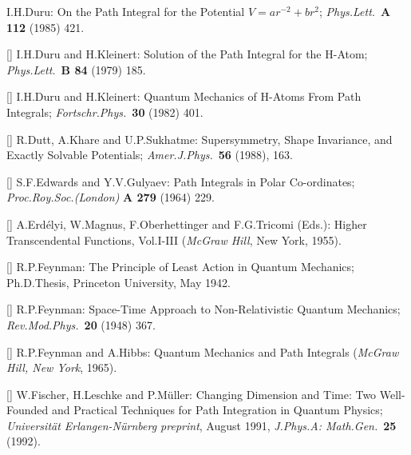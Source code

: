 I.H.Duru:
On the Path Integral for the Potential $V=ar^{-2}+br^2$;
{\it Phys.Lett.}\ {\bf A 112} (1985) 421.
\item{[\DKa]}
I.H.Duru and H.Kleinert:
Solution of the Path Integral for the H-Atom;
{\it Phys.Lett.}\ {\bf B 84} (1979) 185.
\item{[\DKb]}
I.H.Duru and H.Kleinert:
Quantum Mechanics of H-Atoms From Path Integrals;
{\it Fort\-schr.Phys.}\ {\bf 30} (1982) 401.
\item{[\DKS]}
R.Dutt, A.Khare and U.P.Sukhatme:
Supersymmetry, Shape Invariance, and Exactly Solvable Potentials;
{\it Amer.J.Phys.}\ {\bf 56} (1988), 163.
\item{[\EG]}
S.F.Edwards and Y.V.Gulyaev:
Path Integrals in Polar Co-ordinates;
{\it Proc.Roy.Soc.(London)} {\bf A 279} (1964) 229.
\item{[\EMOTa]}
A.Erd\'elyi, W.Magnus, F.Oberhettinger and F.G.Tricomi (Eds.):
Higher Transcendental Functions, Vol.I-III
({\it McGraw Hill}, New York, 1955).
\item{[\FEYa]}
R.P.Feynman:
The Principle of Least Action in Quantum Mechanics;
Ph.D.Thesis, Princeton University, May 1942.
\item{[\FEYb]}
R.P.Feynman:
Space-Time Approach to Non-Relativistic Quantum Mechanics;
{\it Rev.Mod.Phys.}\ {\bf 20} (1948) 367.
\item{[\FH]}
R.P.Feynman and A.Hibbs: Quantum Mechanics and Path Integrals
({\it McGraw Hill, New York}, 1965).
\item{[\FLM]}
W.Fischer, H.Leschke and P.M\"uller:
Changing Dimension and Time: Two Well-Founded and Practical Techniques
for Path Integration in Quantum Physics;
{\it Universit\"at Erlangen-N\"urnberg preprint}, August 1991,
{\it J.Phys.A: Math.Gen.}\ {\bf 25} (1992).

